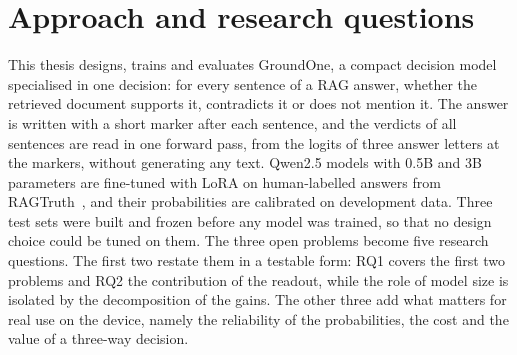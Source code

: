 \section{Approach and research questions}
\label{sec:intro-rq}

This thesis designs, trains and evaluates GroundOne, a compact decision model specialised in one decision: for every sentence
of a RAG answer, whether the retrieved document supports it, contradicts it or does not mention it. The answer is written
with a short marker after each sentence, and the verdicts of all sentences are read in one forward pass, from the logits
of three answer letters at the markers, without generating any text. Qwen2.5 models with 0.5B and 3B parameters are
fine-tuned with LoRA on human-labelled answers from RAGTruth~\cite{qwen2024qwen25,hu2022lora,niu2024ragtruth}, and their
probabilities are calibrated on development data. Three test sets were built and frozen before any model was trained, so
that no design choice could be tuned on them. The three open problems become five research questions. The first two restate them in a testable form: RQ1 covers the first two problems and RQ2 the contribution of the readout, while the role of model size is isolated by the decomposition of the gains. The other three add what matters for real use on the device, namely the reliability
of the probabilities, the cost and the value of a three-way decision.

